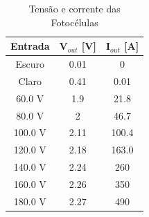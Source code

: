 \begin{table}[!h]
    \centering
    \caption{Tensão e corrente das Fotocélulas}
    \label{tab:circ3}
    \vspace{0.25cm}
    \begin{tabular}{ccc}
        \hline
        \rule{0pt}{3ex}\textbf{Entrada} & \textbf{\textbf{V}}$_{out}$ [V] & \textbf{\textbf{I}}$_{out}$ [A] \\[5pt]
        \hline
        \rule{0pt}{3ex}Escuro & 0.01 & 0 \\
        Claro & 0.41 & 0.01 \\
        60.0 V & 1.9 & 21.8 \\
        80.0 V & 2 & 46.7 \\
        100.0 V & 2.11 & 100.4 \\
        120.0 V & 2.18 & 163.0 \\
        140.0 V & 2.24 & 260 \\
        160.0 V & 2.26 & 350 \\
        180.0 V & 2.27 & 490 \\ [5pt]
        \hline
    \end{tabular}
\end{table}
